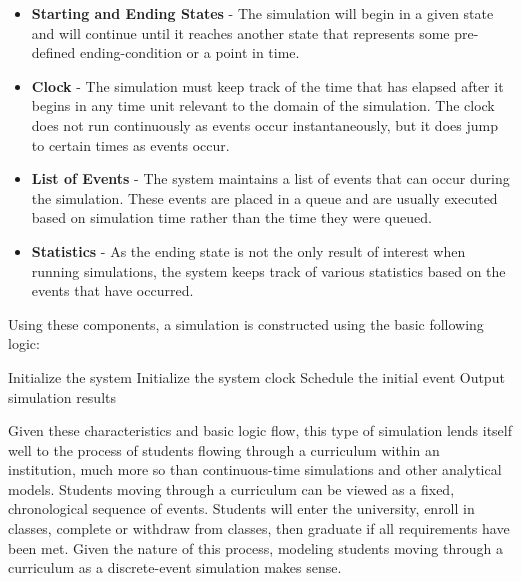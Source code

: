 \documentclass[botnum, fleqn]{unmeethesis}
\begin{document}
    \begin{itemize}
    \item \textbf{Starting and Ending States} - The simulation will begin in a given state and will continue until it reaches another state that represents some pre-defined ending-condition or a point in time.
    \item \textbf{Clock} - The simulation must keep track of the time that has elapsed after it begins in any time unit relevant to the domain of the simulation. The clock does not run continuously as events occur instantaneously, but it does jump to certain times as events occur.
    \item \textbf{List of Events} - The system maintains a list of events that can occur during the simulation. These events are placed in a queue and are usually executed based on simulation time rather than the time they were queued.
    \item \textbf{Statistics} - As the ending state is not the only result of interest when running simulations, the system keeps track of various statistics based on the events that have occurred.
    \end{itemize}

    Using these components, a simulation is constructed using the basic following logic:

    \begin{algorithmic}[1]
    \STATE Initialize the system
    \STATE Initialize the system clock
    \STATE Schedule the initial event
    \ENDWHILE
    \STATE Output simulation results
    \end{algorithmic}

    Given these characteristics and basic logic flow, this type of simulation lends itself well to the process of students flowing through a curriculum within an institution, much more so than continuous-time simulations and other analytical models. Students moving through a curriculum can be viewed as a fixed, chronological sequence of events. Students will enter the university, enroll in classes, complete or withdraw from classes, then graduate if all requirements have been met. Given the nature of this process, modeling students moving through a curriculum as a discrete-event simulation makes sense.
\end{document}
